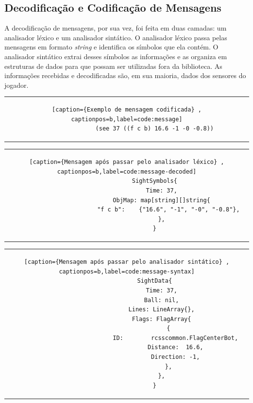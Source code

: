 \subsection{Decodificação e Codificação de Mensagens}
\label{sec:messages}
A decodificação de mensagens, por sua vez, foi feita em duas camadas: um analisador léxico e um analisador sintático. O analisador léxico passa pelas mensagens em formato \textit{string} e identifica os símbolos que ela contém. O analisador sintático extrai desses símbolos as informações e as organiza em estruturas de dados para que possam ser utilizadas fora da biblioteca. As informações recebidas e decodificadas são, em sua maioria, dados dos sensores do jogador.


\begin{tabular}{c}
				\begin{lstlisting}[caption={Exemplo de mensagem codificada} , captionpos=b,label=code:message]
				(see 37 ((f c b) 16.6 -1 -0 -0.8))
				\end{lstlisting}
\end{tabular}

\begin{tabular}{c}
				\begin{lstlisting}[caption={Mensagem após passar pelo analisador léxico} , captionpos=b,label=code:message-decoded]
				SightSymbols{
					Time: 37,
					ObjMap: map[string][]string{
						"f c b":    {"16.6", "-1", "-0", "-0.8"},
					},
				}
				\end{lstlisting}
\end{tabular}


\begin{tabular}{c}
				\begin{lstlisting}[caption={Mensagem após passar pelo analisador sintático} , captionpos=b,label=code:message-syntax]
				SightData{
					Time: 37,
					Ball: nil,
					Lines: LineArray{},
					Flags: FlagArray{
						{
							ID:        rcsscommon.FlagCenterBot,
							Distance:  16.6,
							Direction: -1,
						},
					},
				}
				\end{lstlisting}
\end{tabular}



